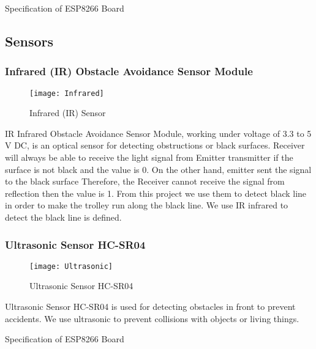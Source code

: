 \documentclass[12pt]{article}
\begin{document}
\begin{table}[H]
	\centering
	\label{tab:esp}
	\caption{Specification of ESP8266 Board}
\end{table}

\subsection{Sensors} \label{sub:sensors}

\subsubsection{Infrared (IR) Obstacle Avoidance Sensor Module} \label{subsub:ir}

\begin{figure}[H]
	\centering
	\texttt{[image: Infrared]}
	\caption{Infrared (IR) Sensor} \label{fig:ir}
\end{figure}

IR Infrared Obstacle Avoidance Sensor Module, working under voltage of 3.3 to 5 V DC, is an optical sensor for detecting obstructions or black surfaces. Receiver will always be able to receive the light signal from Emitter transmitter if the surface is not black and the value is 0. On the other hand, emitter sent the signal to the black surface Therefore, the Receiver cannot receive the signal from reflection then the value is 1. From this project we use them to detect black line in order to make the trolley run along the black line. We use IR infrared to detect the black line is defined.

\subsubsection{Ultrasonic Sensor HC-SR04} \label{subsub:ultra}

\begin{figure}[H]
	\centering
	\texttt{[image: Ultrasonic]}
	\caption{Ultrasonic Sensor HC-SR04} \label{fig:ultra}
\end{figure}

Ultrasonic Sensor HC-SR04 is used for detecting obstacles in front to prevent accidents. We use ultrasonic to prevent collisions with objects or living things.

\begin{table}[H]
	\centering
	\label{tab:ultra}
	\caption{Specification of ESP8266 Board}
\end{table}
\end{document}
